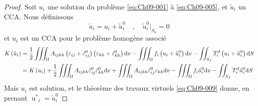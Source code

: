 \begin{proof}
    Soit $u_i$ une solution du problème \eqref{eq:Ch09-001} à \eqref{eq:Ch09-005}, et $\tilde{u}_i$ un CCA.
    Nous définissons
    \begin{equation}
        \tilde{u}_i = u_i + \tilde{u}_i^0 \quad,\quad \tilde{u}_i^0|_{S_u} = 0
        \label{eq:Ch09-017}
    \end{equation}
    et $u_i$ est un CCA pour le problème homogène associé 
    \begin{align*}
        K\left(\tilde{u}_i\right) &=\frac{1}{2} \iiint_{\Omega} A_{ijkh} \left( \varepsilon_{ij} + \tilde{\varepsilon}_{ij}^0 \right) \left( \varepsilon_{kh} + \tilde{\varepsilon}_{kh}^0 \right) \mathrm{d} v - \iiint_{\Omega} f_i \left( u_i + \tilde{u}_i^0 \right) \mathrm{d} v - \iint_{S_f} T_i^d \left( u_i + \tilde{u}_i^0 \right) \mathrm{d} S \\
        &= K\left( u_i \right) + \frac{1}{2} \iiint_{\Omega} A_{ijkh} \tilde{\varepsilon}_{ij}^0 \tilde{\varepsilon}_{kh}^0 \mathrm{d} v + \iiint_{\Omega} A_{ijkh} \tilde{\varepsilon}_{ij}^0 \varepsilon_{kh} \mathrm{d} v - \iiint_{\Omega} f_i \tilde{u}_i^0 \mathrm{d} v - \iint_{S_f} T_i^d \tilde{u}_i^0 \mathrm{d} S
    \end{align*}
    Mais $u_i$ est solution, et le théorème des travaux virtuels \eqref{eq:Ch09-009} donne, en prenant ${\mathop{u}^{\ast}}_i = \tilde{u}_i^0$
    
\end{proof}
\endinput
..u... _ .,u....
prenant * "'.
.. ... 
"'0 ... 
é .. cW
~.n.A...iU E·"'a. E~v.. .k = ~n. Cf"'â ...~ D $ i-.û:: cl,,-+ .u."'. J,:,
s:!. .. las:!. G".i.t l'fI,à <
.,-
